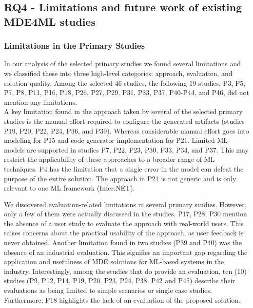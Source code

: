 \subsection{RQ4 - Limitations and future work of existing MDE4ML studies}

\subsubsection{Limitations in the Primary Studies}
In our analysis of the selected primary studies we found several limitations and we classified these into three high-level categories: approach, evaluation, and solution quality. Among the selected 46 studies, the following 19 studies, P3, P5, P7, P8, P11, P16, P18, P26, P27, P29, P31, P33, P37, P40-P44, and P46, did not mention any limitations.\\

 A key limitation found in the approach taken by several of the selected primary studies is the manual effort required to configure the generated artifacts (studies P19, P20, P22, P24, P36, and P39). Whereas considerable manual effort goes into modeling for P15 and code generator implementation for P21. Limited ML models are supported in studies P7, P22, P23, P30, P33, P34, and P37. This may restrict the applicability of these approaches to a broader range of ML techniques. P4 has the limitation that a single error in the model can defeat the purpose of the entire solution. The approach in P21 is not generic and is only relevant to one ML framework (Infer.NET).  

 We discovered evaluation-related limitations in several primary studies. However, only a few of them were actually discussed in the studies. P17, P28, P30 mention the absence of a user study to evaluate the approach with real-world users. This raises concerns about the practical usability of the approach, as user feedback is never obtained. Another limitation found in two studies (P39 and P40) was the absence of an industrial evaluation. This signifies an important gap regarding the application and usefulness of MDE solutions for ML-based systems in the industry. Interestingly, among the studies that do provide an evaluation, ten (10) studies (P9, P12, P14, P19, P20, P23, P24, P38, P42 and P45) describe their evaluations as being limited to simple scenarios or single case studies. Furthermore, P18 highlights the lack of an evaluation of the proposed solution.

